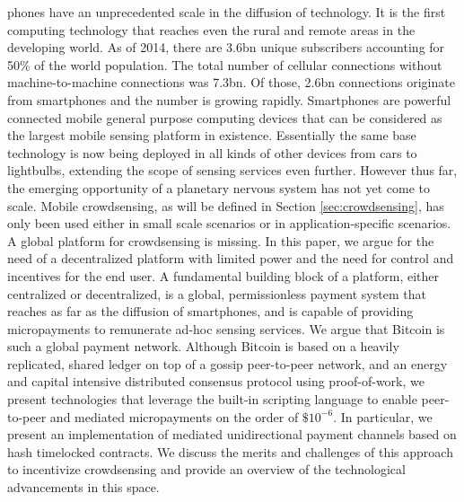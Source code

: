 \documentclass[10pt,journal,compsoc]{IEEEtran}
\begin{document}
% 
% 
% 
% 
 phones have an unprecedented scale in the diffusion of technology. It is the first computing technology that reaches even the rural and remote areas in the developing world. As of 2014, there are 3.6bn unique subscribers accounting for 50\% of the world population. The total number of cellular connections without machine-to-machine connections was 7.3bn. Of those, 2.6bn connections originate from smartphones and the number is growing rapidly. Smartphones are powerful connected mobile general purpose computing devices that can be considered as the largest mobile sensing platform in existence. Essentially the same base technology is now being deployed in all kinds of other devices from cars to lightbulbs, extending the scope of sensing services even further. However thus far, the emerging opportunity of a planetary nervous system \cite{giannotti2012planetary} has not yet come to scale. Mobile crowdsensing, as will be defined in Section \ref{sec:crowdsensing}, has only been used either in small scale scenarios or in application-specific scenarios. A global platform for crowdsensing is missing. In this paper, we argue for the need of a decentralized platform with limited power and the need for control and incentives for the end user. A fundamental building block of a platform, either centralized or decentralized, is a global, permissionless payment system that reaches as far as the diffusion of smartphones, and is capable of providing micropayments to remunerate ad-hoc sensing services. We argue that Bitcoin is such a global payment network. Although Bitcoin is based on a heavily replicated, shared ledger on top of a gossip peer-to-peer network, and an energy and capital intensive distributed consensus protocol using proof-of-work, we present technologies that leverage the built-in scripting language to enable peer-to-peer and mediated micropayments on the order of $\$10^{-6}$. In particular, we present an implementation of mediated unidirectional payment channels based on hash timelocked contracts. We discuss the merits and challenges of this approach to incentivize crowdsensing and provide an overview of the technological advancements in this space. 
\end{document}
